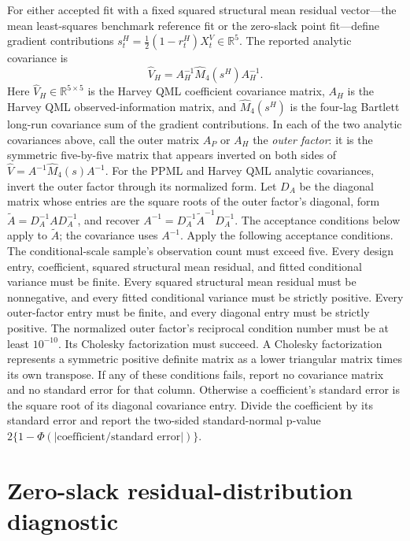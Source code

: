 \documentclass[11pt]{article}
\begin{document}
For either accepted fit with a fixed squared structural mean residual vector---the mean least-squares benchmark
reference fit or the zero-slack point fit---define gradient contributions
\(s_t^H=\tfrac12(1-r_t^H)X_t^V\in\mathbb R^5\). The reported analytic covariance is
\begin{equation*}
 \widehat V_H=A_H^{-1}\widehat M_4(s^H)A_H^{-1}.
\end{equation*}
Here \(\widehat V_H\in\mathbb R^{5\times5}\) is the Harvey QML coefficient covariance matrix,
\(A_H\) is the Harvey QML observed-information matrix, and \(\widehat M_4(s^H)\) is the four-lag
Bartlett long-run covariance sum of the gradient contributions.
In each of the two analytic covariances above, call the outer matrix \(A_P\) or \(A_H\) the
\emph{outer factor}: it is the symmetric five-by-five matrix that appears inverted on both sides of
\(\widehat V=A^{-1}\widehat M_4(s)A^{-1}\). For the PPML and Harvey QML analytic covariances, invert the outer factor through its normalized form. Let
\(D_A\) be the diagonal matrix whose entries are the square roots of the outer factor's diagonal, form
\(\widetilde A=D_A^{-1}AD_A^{-1}\), and recover \(A^{-1}=D_A^{-1}\widetilde A^{-1}D_A^{-1}\). The
acceptance conditions below apply to \(\widetilde A\); the covariance uses \(A^{-1}\). Apply the
following acceptance conditions. The conditional-scale sample's observation count must exceed five.
Every design entry, coefficient, squared structural mean residual, and fitted conditional variance
must be finite. Every squared structural mean residual must be nonnegative, and every fitted
conditional variance must be strictly positive. Every outer-factor entry must be finite, and every
diagonal entry must be strictly positive. The normalized outer factor's reciprocal condition number
must be at least \(10^{-10}\). Its Cholesky factorization must succeed. A Cholesky factorization
represents a symmetric positive definite matrix as a lower triangular matrix times its own
transpose. If any of these conditions
fails, report no covariance matrix and no standard error for that column. Otherwise a coefficient's
standard error is the square root
of its diagonal covariance entry. Divide the coefficient by its standard error and report the
two-sided standard-normal p-value
\(2\{1-\Phi(|\text{coefficient}/\text{standard error}|)\}\).

\section{Zero-slack residual-distribution diagnostic}
\label{sec:residual-distribution}
\end{document}
